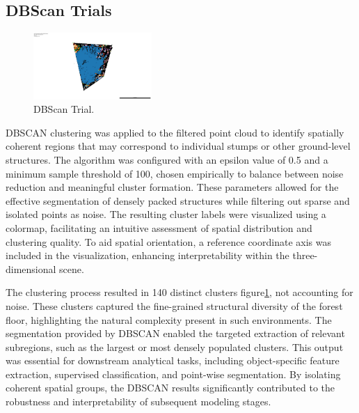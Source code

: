 \documentclass[../report.tex]{subfiles}
\begin{document}
    \subsection{DBScan Trials}
    \begin{figure}[H]
        \centering
        \includegraphics[width=0.4\textwidth]{rnd-project-report-main/figures/clustered_output_with_scale.jpg}
        \caption{DBScan Trial.}
        \label{fig:dbscan_trial}
    \end{figure}
    DBSCAN clustering was applied to the filtered point cloud to identify spatially coherent regions that may correspond to individual stumps or other ground-level structures. The algorithm was configured with an epsilon value of 0.5 and a minimum sample threshold of 100, chosen empirically to balance between noise reduction and meaningful cluster formation. These parameters allowed for the effective segmentation of densely packed structures while filtering out sparse and isolated points as noise. The resulting cluster labels were visualized using a colormap, facilitating an intuitive assessment of spatial distribution and clustering quality. To aid spatial orientation, a reference coordinate axis was included in the visualization, enhancing interpretability within the three-dimensional scene.

    The clustering process resulted in 140 distinct clusters figure\ref{fig:dbscan_trial}, not accounting for noise. These clusters captured the fine-grained structural diversity of the forest floor, highlighting the natural complexity present in such environments. The segmentation provided by DBSCAN enabled the targeted extraction of relevant subregions, such as the largest or most densely populated clusters. This output was essential for downstream analytical tasks, including object-specific feature extraction, supervised classification, and point-wise segmentation. By isolating coherent spatial groups, the DBSCAN results significantly contributed to the robustness and interpretability of subsequent modeling stages.
\end{document}

